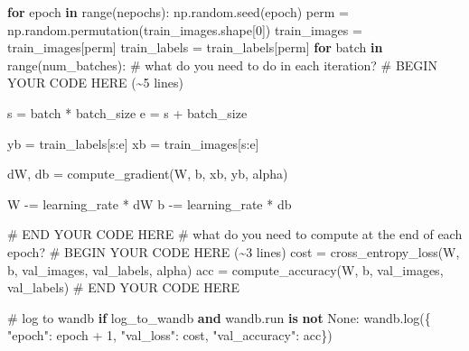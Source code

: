 \documentclass[
  letterpaper,
  DIV=11,
  numbers=noendperiod]{scrartcl}
\newenvironment{Shaded}{\begin{snugshade}}{\end{snugshade}}
\newcommand{\BuiltInTok}[1]{\textcolor[rgb]{0.00,0.23,0.31}{#1}}
\newcommand{\CommentTok}[1]{\textcolor[rgb]{0.37,0.37,0.37}{#1}}
\newcommand{\ControlFlowTok}[1]{\textcolor[rgb]{0.00,0.23,0.31}{\textbf{#1}}}
\newcommand{\DecValTok}[1]{\textcolor[rgb]{0.68,0.00,0.00}{#1}}
\newcommand{\KeywordTok}[1]{\textcolor[rgb]{0.00,0.23,0.31}{\textbf{#1}}}
\newcommand{\NormalTok}[1]{\textcolor[rgb]{0.00,0.23,0.31}{#1}}
\newcommand{\OperatorTok}[1]{\textcolor[rgb]{0.37,0.37,0.37}{#1}}
\newcommand{\RegionMarkerTok}[1]{\textcolor[rgb]{0.00,0.23,0.31}{#1}}
\newcommand{\StringTok}[1]{\textcolor[rgb]{0.13,0.47,0.30}{#1}}
\newcommand{\VariableTok}[1]{\textcolor[rgb]{0.07,0.07,0.07}{#1}}
\begin{document}
\begin{Shaded}
\begin{Highlighting}[]
    \ControlFlowTok{for}\NormalTok{ epoch }\KeywordTok{in} \BuiltInTok{range}\NormalTok{(nepochs):}
\NormalTok{        np.random.seed(epoch)}
\NormalTok{        perm }\OperatorTok{=}\NormalTok{ np.random.permutation(train\_images.shape[}\DecValTok{0}\NormalTok{])}
\NormalTok{        train\_images }\OperatorTok{=}\NormalTok{ train\_images[perm]}
\NormalTok{        train\_labels }\OperatorTok{=}\NormalTok{ train\_labels[perm]}
        \ControlFlowTok{for}\NormalTok{ batch }\KeywordTok{in} \BuiltInTok{range}\NormalTok{(num\_batches):}
            \CommentTok{\# what do you need to do in each iteration?}
            \CommentTok{\# }\RegionMarkerTok{BEGIN}\CommentTok{ YOUR CODE HERE (\textasciitilde{}5 lines)}

\NormalTok{            s }\OperatorTok{=}\NormalTok{ batch }\OperatorTok{*}\NormalTok{ batch\_size}
\NormalTok{            e }\OperatorTok{=}\NormalTok{ s }\OperatorTok{+}\NormalTok{ batch\_size}

\NormalTok{            yb }\OperatorTok{=}\NormalTok{ train\_labels[s:e]}
\NormalTok{            xb }\OperatorTok{=}\NormalTok{ train\_images[s:e]}

\NormalTok{            dW, db }\OperatorTok{=}\NormalTok{ compute\_gradient(W, b, xb, yb, alpha)}

\NormalTok{            W }\OperatorTok{{-}=}\NormalTok{ learning\_rate }\OperatorTok{*}\NormalTok{ dW}
\NormalTok{            b }\OperatorTok{{-}=}\NormalTok{ learning\_rate }\OperatorTok{*}\NormalTok{ db}

            \CommentTok{\# }\RegionMarkerTok{END}\CommentTok{ YOUR CODE HERE}
        \CommentTok{\# what do you need to compute at the end of each epoch?}
        \CommentTok{\# }\RegionMarkerTok{BEGIN}\CommentTok{ YOUR CODE HERE (\textasciitilde{}3 lines)}
\NormalTok{        cost }\OperatorTok{=}\NormalTok{ cross\_entropy\_loss(W, b, val\_images, val\_labels, alpha)}
\NormalTok{        acc }\OperatorTok{=}\NormalTok{ compute\_accuracy(W, b, val\_images, val\_labels)}
        \CommentTok{\# }\RegionMarkerTok{END}\CommentTok{ YOUR CODE HERE}

        \CommentTok{\# log to wandb}
        \ControlFlowTok{if}\NormalTok{ log\_to\_wandb }\KeywordTok{and}\NormalTok{ wandb.run }\KeywordTok{is} \KeywordTok{not} \VariableTok{None}\NormalTok{:}
\NormalTok{            wandb.log(\{}
                \StringTok{"epoch"}\NormalTok{: epoch }\OperatorTok{+} \DecValTok{1}\NormalTok{,}
                \StringTok{"val\_loss"}\NormalTok{: cost,}
                \StringTok{"val\_accuracy"}\NormalTok{: acc\})}


\end{Highlighting}
\end{Shaded}
\end{document}
